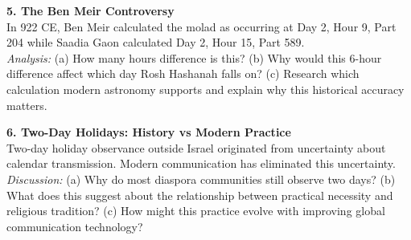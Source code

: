 {\vspace{1em}

\textbf{5. The Ben Meir Controversy} \\[0.5em]
In 922 CE, Ben Meir calculated the molad as occurring at \QSOpen{}Day 2, Hour 9, Part 204\QSClose{} while Saadia Gaon calculated \QSOpen{}Day 2, Hour 15, Part 589.\QSClose{} \\
\emph{Analysis:} (a) How many hours difference is this? (b) Why would this 6-hour difference affect which day Rosh Hashanah falls on? (c) Research which calculation modern astronomy supports and explain why this historical accuracy matters.

\vspace{1em}

\textbf{6. Two-Day Holidays: History vs Modern Practice} \\[0.5em]
Two-day holiday observance outside Israel originated from uncertainty about calendar transmission. Modern communication has eliminated this uncertainty. \\
\emph{Discussion:} (a) Why do most diaspora communities still observe two days? (b) What does this suggest about the relationship between practical necessity and religious tradition? (c) How might this practice evolve with improving global communication technology?
} 